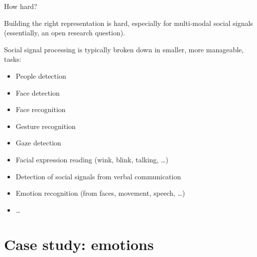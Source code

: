 \documentclass[compress]{beamer}
\begin{document}
\begin{frame}{How hard?}

    Building the right representation is hard, especially for multi-modal social
    signals (essentially, an open research
    question).

    \pause

Social signal processing is typically broken down in smaller, more manageable,
    tasks:

\begin{itemize}

\item People detection
\item Face detection
\item Face recognition
\item Gesture recognition
\item Gaze detection
\item Facial expression reading (wink, blink, talking, \ldots{})
\item Detection of social signals from verbal communication
\item Emotion recognition (from faces, movement, speech, \ldots{})
\item \ldots{}
\end{itemize}

\end{frame}



\section{Case study: emotions}
\end{document}
